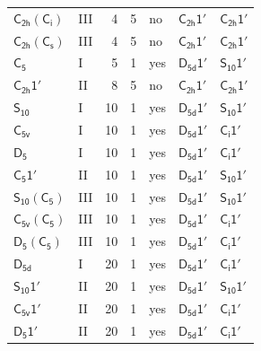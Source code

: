 \documentclass[10pt,a4paper]{article}
\numberwithin{equation}{section}
\newcommand{\grp}[1]{\mathsf{#1}}
\begin{document}
{\begin{longtable}{@{}llrrlll@{}}
\href{C2h-S2.pdf}{$\grp{C_{2h}}(\grp{C_{i}})$} & III & 4 & 5 & no & \href{C2h-1p.pdf}{$\grp{C_{2h}1'}$} & \href{C2h-1p.pdf}{$\grp{C_{2h}1'}$}\\
\href{C2h-C1v.pdf}{$\grp{C_{2h}}(\grp{C_{s}})$} & III & 4 & 5 & no & \href{C2h-1p.pdf}{$\grp{C_{2h}1'}$} & \href{C2h-1p.pdf}{$\grp{C_{2h}1'}$}\\
\href{../../../rotation/data/pdf/C5.pdf}{$\grp{C_{5}}$} & I & 5 & 1 & yes & \href{D5d-1p.pdf}{$\grp{D_{5d}1'}$} & \href{S10-1p.pdf}{$\grp{S_{10}1'}$}\\
\href{C2h-1p.pdf}{$\grp{C_{2h}1'}$} & II & 8 & 5 & no & \href{C2h-1p.pdf}{$\grp{C_{2h}1'}$} & \href{C2h-1p.pdf}{$\grp{C_{2h}1'}$}\\
\href{../../../rotation/data/pdf/S10.pdf}{$\grp{S_{10}}$} & I & 10 & 1 & yes & \href{D5d-1p.pdf}{$\grp{D_{5d}1'}$} & \href{S10-1p.pdf}{$\grp{S_{10}1'}$}\\
\href{../../../rotation/data/pdf/C5v.pdf}{$\grp{C_{5v}}$} & I & 10 & 1 & yes & \href{D5d-1p.pdf}{$\grp{D_{5d}1'}$} & \href{S2-1p.pdf}{$\grp{C_{i}1'}$}\\
\href{../../../rotation/data/pdf/D5.pdf}{$\grp{D_{5}}$} & I & 10 & 1 & yes & \href{D5d-1p.pdf}{$\grp{D_{5d}1'}$} & \href{S2-1p.pdf}{$\grp{C_{i}1'}$}\\
\href{C5-1p.pdf}{$\grp{C_{5}1'}$} & II & 10 & 1 & yes & \href{D5d-1p.pdf}{$\grp{D_{5d}1'}$} & \href{S10-1p.pdf}{$\grp{S_{10}1'}$}\\
\href{S10-C5.pdf}{$\grp{S_{10}}(\grp{C_{5}})$} & III & 10 & 1 & yes & \href{D5d-1p.pdf}{$\grp{D_{5d}1'}$} & \href{S10-1p.pdf}{$\grp{S_{10}1'}$}\\
\href{C5v-C5.pdf}{$\grp{C_{5v}}(\grp{C_{5}})$} & III & 10 & 1 & yes & \href{D5d-1p.pdf}{$\grp{D_{5d}1'}$} & \href{S2-1p.pdf}{$\grp{C_{i}1'}$}\\
\href{D5-C5.pdf}{$\grp{D_{5}}(\grp{C_{5}})$} & III & 10 & 1 & yes & \href{D5d-1p.pdf}{$\grp{D_{5d}1'}$} & \href{S2-1p.pdf}{$\grp{C_{i}1'}$}\\
\href{../../../rotation/data/pdf/D5d.pdf}{$\grp{D_{5d}}$} & I & 20 & 1 & yes & \href{D5d-1p.pdf}{$\grp{D_{5d}1'}$} & \href{S2-1p.pdf}{$\grp{C_{i}1'}$}\\
\href{S10-1p.pdf}{$\grp{S_{10}1'}$} & II & 20 & 1 & yes & \href{D5d-1p.pdf}{$\grp{D_{5d}1'}$} & \href{S10-1p.pdf}{$\grp{S_{10}1'}$}\\
\href{C5v-1p.pdf}{$\grp{C_{5v}1'}$} & II & 20 & 1 & yes & \href{D5d-1p.pdf}{$\grp{D_{5d}1'}$} & \href{S2-1p.pdf}{$\grp{C_{i}1'}$}\\
\href{D5-1p.pdf}{$\grp{D_{5}1'}$} & II & 20 & 1 & yes & \href{D5d-1p.pdf}{$\grp{D_{5d}1'}$} & \href{S2-1p.pdf}{$\grp{C_{i}1'}$}\\

\end{longtable}}
\end{document}
